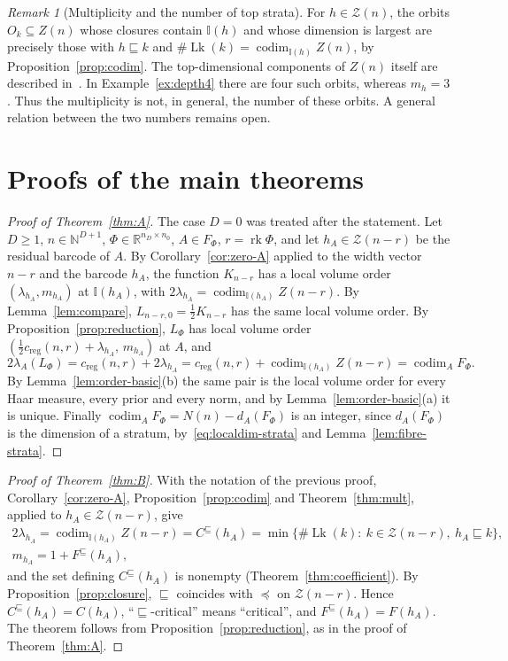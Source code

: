 \documentclass[11pt,a4paper]{article}
\theoremstyle{definition}
\theoremstyle{remark}
\newtheorem{remark}[theorem]{Remark}
\numberwithin{equation}{section}
\newcommand{\N}{\mathbb{N}}
\newcommand{\R}{\mathbb{R}}
\newcommand{\rk}{\operatorname{rk}}
\newcommand{\codim}{\operatorname{codim}}
\newcommand{\creg}{c_{\mathrm{reg}}}
\newcommand{\Zb}{\mathcal Z}
\newcommand{\I}{\mathbb I}
\newcommand{\Lk}{\operatorname{Lk}}
\begin{document}
\begin{remark}[Multiplicity and the number of top strata]\label{rem:components}
For $h\in\Zb(n)$, the orbits $O_k\subseteq Z(n)$ whose closures contain $\I(h)$ and whose dimension is largest are precisely those with $h\sqsubseteq k$ and $\#\Lk(k)=\codim_{\I(h)}Z(n)$, by Proposition~\ref{prop:codim}. The top-dimensional components of $Z(n)$ itself are described in~\cite{lehalleur-rimanyi,koncki-rimanyi}. In Example~\ref{ex:depth4} there are four such orbits, whereas $m_h=3$. Thus the multiplicity is not, in general, the number of these orbits. A general relation between the two numbers remains open.
\end{remark}
\section{Proofs of the main theorems}\label{sec:proofs}

\begin{proof}[Proof of Theorem~\ref{thm:A}]
The case $D=0$ was treated after the statement. Let $D\ge1$, $n\in\N^{D+1}$, $\Phi\in\R^{n_D\times n_0}$, $A\in F_\Phi$, $r=\rk\Phi$, and let $h_A\in\Zb(n-r)$ be the residual barcode of $A$. By Corollary~\ref{cor:zero-A} applied to the width vector $n-r$ and the barcode $h_A$, the function $K_{n-r}$ has a local volume order $(\lambda_{h_A},m_{h_A})$ at $\I(h_A)$, with $2\lambda_{h_A}=\codim_{\I(h_A)}Z(n-r)$. By Lemma~\ref{lem:compare}, $L_{n-r,0}=\frac{1}{2}K_{n-r}$ has the same local volume order. By Proposition~\ref{prop:reduction}, $L_\Phi$ has local volume order $(\frac{1}{2}\creg(n,r)+\lambda_{h_A},\,m_{h_A})$ at $A$, and
\[
2\lambda_A(L_\Phi)=\creg(n,r)+2\lambda_{h_A}=\creg(n,r)+\codim_{\I(h_A)}Z(n-r)=\codim_AF_\Phi .
\]
By Lemma~\ref{lem:order-basic}(b) the same pair is the local volume order for every Haar measure, every prior and every norm, and by Lemma~\ref{lem:order-basic}(a) it is unique. Finally $\codim_AF_\Phi=N(n)-d_A(F_\Phi)$ is an integer, since $d_A(F_\Phi)$ is the dimension of a stratum, by~\eqref{eq:localdim-strata} and Lemma~\ref{lem:fibre-strata}.
\end{proof}

\begin{proof}[Proof of Theorem~\ref{thm:B}]
With the notation of the previous proof, Corollary~\ref{cor:zero-A}, Proposition~\ref{prop:codim} and Theorem~\ref{thm:mult}, applied to $h_A\in\Zb(n-r)$, give
\begin{gather*}
2\lambda_{h_A}=\codim_{\I(h_A)}Z(n-r)=C^\sqsubseteq(h_A)=\min\{\#\Lk(k):\ k\in\Zb(n-r),\ h_A\sqsubseteq k\},\\
m_{h_A}=1+F^\sqsubseteq(h_A),
\end{gather*}
and the set defining $C^\sqsubseteq(h_A)$ is nonempty (Theorem~\ref{thm:coefficient}). By Proposition~\ref{prop:closure}, $\sqsubseteq$ coincides with $\preceq$ on $\Zb(n-r)$. Hence $C^\sqsubseteq(h_A)=C(h_A)$, ``$\sqsubseteq$-critical'' means ``critical'', and $F^\sqsubseteq(h_A)=F(h_A)$. The theorem follows from Proposition~\ref{prop:reduction}, as in the proof of Theorem~\ref{thm:A}.
\end{proof}
\end{document}
